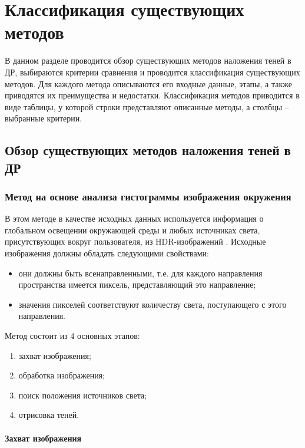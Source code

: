 \chapter{Классификация существующих методов}

В данном разделе проводится обзор существующих методов наложения теней в ДР, выбираются критерии сравнения и проводится классификация существующих методов. Для каждого метода описываются его входные данные, этапы, а также приводятся их преимущества и недостатки. Классификация методов приводится в виде таблицы, у которой строки представляют описанные методы, а столбцы -- выбранные критерии.

\section{Обзор существующих методов наложения теней в ДР}

\subsection{Метод на основе анализа гистограммы изображения окружения}

В этом методе в качестве исходных данных используется информация о глобальном освещении окружающей среды и любых источниках света, присутствующих вокруг пользователя, из HDR-изображений \cite{osti2019real}. Исходные изображения должны обладать следующими свойствами:

\begin{itemize}
	\item они должны быть всенаправленными, т.е. для каждого направления пространства имеется пиксель, представляющий это направление;
	\item значения пикселей соответствуют количеству света, поступающего с этого направления.
\end{itemize}

Метод состоит из 4 основных этапов:

\begin{enumerate}
	\item захват изображения;
	\item обработка изображения;
	\item поиск положения источников света;
	\item отрисовка теней.
\end{enumerate}

\subsubsection*{Захват изображения}


